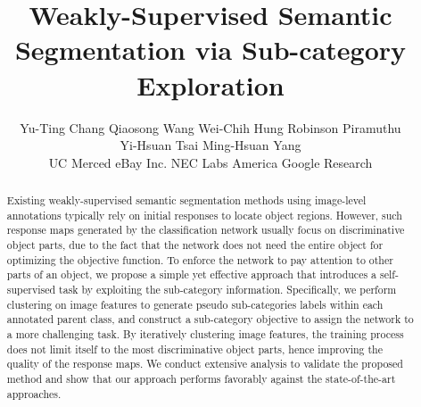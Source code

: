 \documentclass[10pt,twocolumn,letterpaper]{article}
\begin{document}
\title{Weakly-Supervised Semantic Segmentation via Sub-category Exploration}





\author{
		Yu-Ting Chang
		\hspace{0.15in} Qiaosong Wang
		\hspace{0.15in} Wei-Chih Hung 
		\hspace{0.15in} Robinson  Piramuthu\\
		\hspace{0.15in} Yi-Hsuan Tsai
		\hspace{0.15in} Ming-Hsuan Yang
		\vspace{1mm}\\
		UC Merced \hspace{0.15in} eBay Inc.\hspace{0.15in} NEC Labs America \hspace{0.15in} Google Research
	}


\maketitle


\begin{abstract}
Existing weakly-supervised semantic segmentation methods using image-level annotations typically rely on initial responses to locate object regions.
However, such response maps generated by the classification network usually focus on discriminative object parts, due to the fact that the network does not need the entire object for optimizing the objective function.
To enforce the network to pay attention to other parts of an object, we propose a simple yet effective approach that introduces a self-supervised task by exploiting the sub-category information.
Specifically, we perform clustering on image features to generate pseudo sub-categories labels within each annotated parent class, and construct a sub-category objective to assign the network to a more challenging task.
By iteratively clustering image features, the training process does not limit itself to the most discriminative object parts, hence improving the quality of the response maps.
We conduct extensive analysis to validate the proposed method and show that our approach performs favorably against the state-of-the-art approaches.




\end{abstract}
\end{document}
